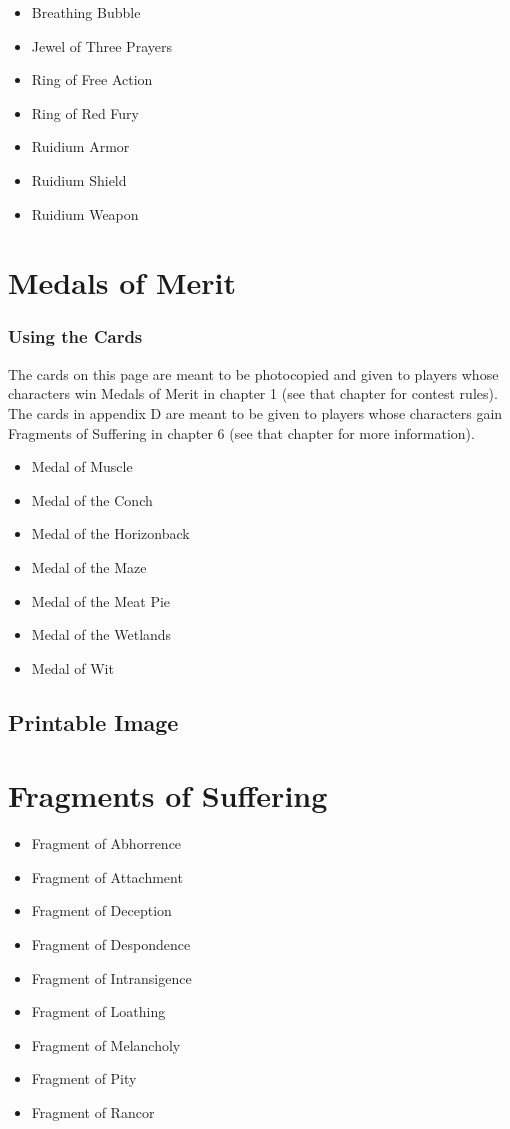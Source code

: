 \documentclass[10pt,a4,twoside,twocolumn,openany,nodeprecatedcode]{dndbook}
\begin{document}
\begin{itemize}

\item Breathing Bubble
\item Jewel of Three Prayers
\item Ring of Free Action
\item Ring of Red Fury
\item Ruidium Armor
\item Ruidium Shield
\item Ruidium Weapon
\end{itemize}


\chapter{Medals of Merit}
\subsection{Using the Cards}
The cards on this page are meant to be photocopied and given to players whose characters win Medals of Merit in chapter 1 (see that chapter for contest rules).
The cards in appendix D are meant to be given to players whose characters gain Fragments of Suffering in chapter 6 (see that chapter for more information).
\begin{itemize}

\item Medal of Muscle
\item Medal of the Conch
\item Medal of the Horizonback
\item Medal of the Maze
\item Medal of the Meat Pie
\item Medal of the Wetlands
\item Medal of Wit
\end{itemize}


\section{Printable Image}
\chapter{Fragments of Suffering}
\begin{itemize}

\item Fragment of Abhorrence
\item Fragment of Attachment
\item Fragment of Deception
\item Fragment of Despondence
\item Fragment of Intransigence
\item Fragment of Loathing
\item Fragment of Melancholy
\item Fragment of Pity
\item Fragment of Rancor
\end{itemize}
\end{document}
